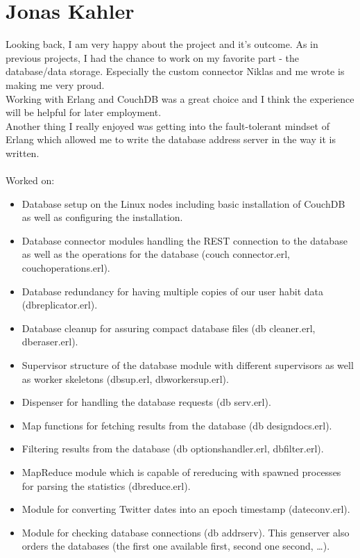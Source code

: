 \section{Jonas Kahler}
Looking back, I am very happy about the project and it’s outcome. As in previous
projects, I had the chance to work on my favorite part - the database/data
storage. Especially the custom connector Niklas and me wrote is making me very
proud. \\
Working with Erlang and CouchDB was a great choice and I think the experience
will be helpful for later employment. \\
Another thing I really enjoyed was getting into the fault-tolerant mindset of
Erlang which allowed me to write the database address server in the way it is
written. \\ \\
Worked on:
\begin{itemize}
  \item Database setup on the Linux nodes including basic installation of
        CouchDB as well as configuring the installation.
  \item Database connector modules handling the REST connection to the database
        as well as the operations for the database (couch\textunderscore
        connector.erl, couch\textunderscore operations.erl).
  \item Database redundancy for having multiple copies of our user habit data
        (db\textunderscore replicator.erl).
  \item Database cleanup for assuring compact database files (db\textunderscore
        cleaner.erl, db\textunderscore eraser.erl).
  \item Supervisor structure of the database module with different supervisors
        as well as worker skeletons (db\textunderscore sup.erl,
        db\textunderscore worker\textunderscore sup.erl).
  \item Dispenser for handling the database requests (db\textunderscore
        serv.erl).
  \item Map functions for fetching results from the database (db\textunderscore
        designdocs.erl).
  \item Filtering results from the database (db\textunderscore
        options\textunderscore handler.erl, db\textunderscore filter.erl).
  \item MapReduce module which is capable of rereducing with spawned processes
        for parsing the statistics (db\textunderscore reduce.erl).
  \item Module for converting Twitter dates into an epoch timestamp
        (dateconv.erl).
  \item Module for checking database connections (db\textunderscore
        addr\textunderscore serv). This gen\textunderscore server also orders
        the databases (the first one available first, second one second, \ldots).
\end{itemize}
\newpage

